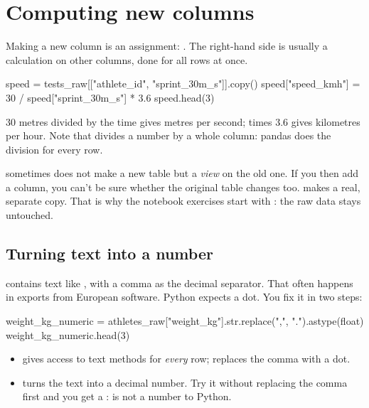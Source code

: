 \documentclass[11pt,a4paper]{article}
\begin{document}
\section{Computing new columns}

Making a new column is an assignment: .
The right-hand side is usually a calculation on other columns, done for
all rows at once.

\begin{python}
speed = tests_raw[["athlete_id", "sprint_30m_s"]].copy()
speed["speed_kmh"] = 30 / speed["sprint_30m_s"] * 3.6
speed.head(3)
\end{python}

30 metres divided by the time gives metres per second; times 3.6 gives
kilometres per hour. Note that 
divides a number by a whole column: pandas does the division for every
row.

\begin{watchout}
 sometimes does not make a new table but a
\emph{view} on the old one. If you then add a column, you can't be sure
whether the original table changes too.  makes a real,
separate copy. That is why the notebook exercises start with
: the raw data stays untouched.
\end{watchout}

\subsection{Turning text into a number}

 contains text like , with a comma as the
decimal separator. That often happens in exports from European
software. Python expects a dot. You fix it in two steps:

\begin{python}
weight_kg_numeric = athletes_raw["weight_kg"].str.replace(",", ".").astype(float)
weight_kg_numeric.head(3)
\end{python}

\begin{itemize}
  \item {} gives access to text methods for \emph{every} row;
         replaces the comma with a dot.
  \item {} turns the text into a decimal number. Try
        it without replacing the comma first and you get a
        :  is not a number to Python.
\end{itemize}
\end{document}
